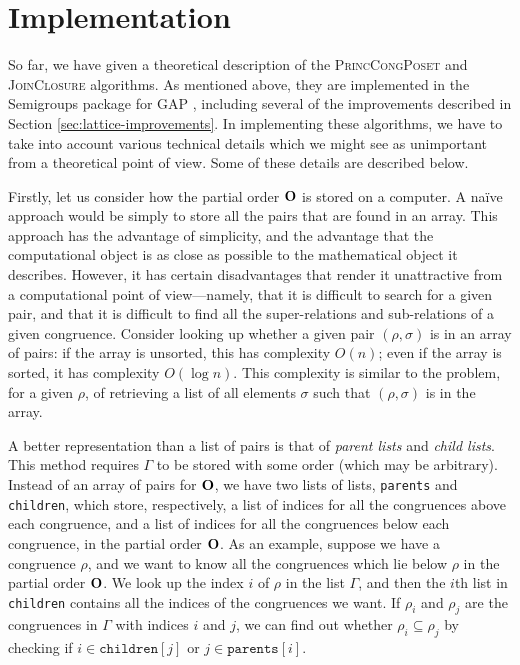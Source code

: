 \section{Implementation}
\label{sec:lattice-implementation}

So far, we have given a theoretical description of the \textsc{PrincCongPoset}
and \textsc{JoinClosure} algorithms.  As mentioned above, they are implemented
in the Semigroups package \cite{semigroups} for GAP \cite{gap}, including
several of the improvements described in Section \ref{sec:lattice-improvements}.
In implementing these algorithms, we have to take into account various technical
details which we might see as unimportant from a theoretical point of view.
Some of these details are described below.

Firstly, let us consider how the partial order $\mathbf{O}$ is stored on a computer.  A
na\"ive approach would be simply to store all the pairs that are found in an
array.  This approach has the advantage of simplicity, and the advantage that
the computational object is as close as possible to the mathematical object it
describes.  However, it has certain disadvantages that render it unattractive
from a computational point of view---namely, that it is difficult to search for
a given pair, and that it is difficult to find all the super-relations and
sub-relations of a given congruence.  Consider looking up whether a given pair
$(\rho,\sigma)$ is in an array of pairs: if the array is unsorted, this has
complexity $O(n)$; even if the array is sorted, it has complexity $O(\log n)$.
This complexity is similar to the problem, for a given $\rho$, of retrieving a
list of all elements $\sigma$ such that $(\rho, \sigma)$ is in the array.

A better representation than a list of pairs is that of \textit{parent lists}
and \textit{child lists}.  This method requires $\Gamma$ to be stored with some
order (which may be arbitrary).  Instead of an array of pairs for $\mathbf{O}$, we have
two lists of lists, \texttt{parents} and \texttt{children}, which store,
respectively, a list of indices for all the congruences above each congruence,
and a list of indices for all the congruences below each congruence, in the
partial order $\mathbf{O}$.  As an example, suppose we have a congruence $\rho$, and we
want to know all the congruences which lie below $\rho$ in the partial order
$\mathbf{O}$.  We look up the index $i$ of $\rho$ in the list $\Gamma$, and then the
$i$th list in \texttt{children} contains all the indices of the congruences we
want.  If $\rho_i$ and $\rho_j$ are the congruences in $\Gamma$ with indices $i$
and $j$, we can find out whether $\rho_i \subseteq \rho_j$ by checking if
$i \in \mathtt{children}[j]$ or $j \in \mathtt{parents}[i]$.

